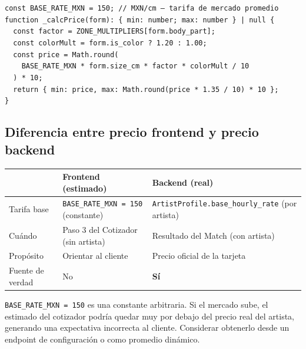 \documentclass[11pt,a4paper]{article}
\begin{document}
\begin{tcolorbox}[codebox, title={cotizador.component.ts — \_calcPrice()}]
\texttt{const BASE\_RATE\_MXN = 150;  // MXN/cm — tarifa de mercado promedio}\\[6pt]
\texttt{function \_calcPrice(form): \{ min: number; max: number \} | null \{}\\
\texttt{\ \ const factor = ZONE\_MULTIPLIERS[form.body\_part];}\\
\texttt{\ \ const colorMult = form.is\_color ? 1.20 : 1.00;}\\
\texttt{\ \ const price = Math.round(}\\
\texttt{\ \ \ \ BASE\_RATE\_MXN * form.size\_cm * factor * colorMult / 10}\\
\texttt{\ \ ) * 10;}\\
\texttt{\ \ return \{ min: price, max: Math.round(price * 1.35 / 10) * 10 \};}\\
\texttt{\}}
\end{tcolorbox}

\subsection{Diferencia entre precio frontend y precio backend}

\begin{center}
\begin{tabularx}{0.95\textwidth}{lXX}
\toprule
\rowcolor{blkMid}
\textcolor{blkGold}{\textbf{}} &
\textcolor{blkGold}{\textbf{Frontend (estimado)}} &
\textcolor{blkGold}{\textbf{Backend (real)}}\\
\midrule
Tarifa base & \texttt{BASE\_RATE\_MXN = 150} (constante) & \texttt{ArtistProfile.base\_hourly\_rate} (por artista)\\
\rowcolor{blkMid}
Cuándo & Paso 3 del Cotizador (sin artista) & Resultado del Match (con artista)\\
Propósito & Orientar al cliente & Precio oficial de la tarjeta\\
\rowcolor{blkMid}
Fuente de verdad & No & \textbf{Sí}\\
\bottomrule
\end{tabularx}
\end{center}

\begin{tcolorbox}[warnbox, title={Riesgo de desincronización}]
\texttt{BASE\_RATE\_MXN = 150} es una constante arbitraria. Si el mercado sube,
el estimado del cotizador podría quedar muy por debajo del precio real del artista,
generando una expectativa incorrecta al cliente. Considerar obtenerlo desde un
endpoint de configuración o como promedio dinámico.
\end{tcolorbox}
\end{document}
